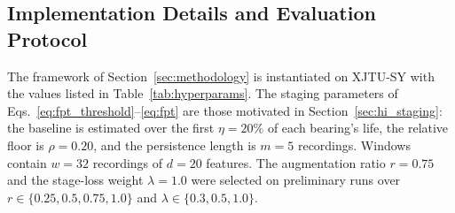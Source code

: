 
\subsection{Implementation Details and Evaluation Protocol}
\label{sec:implementation}

The framework of Section~\ref{sec:methodology} is instantiated on
XJTU-SY with the values listed in Table~\ref{tab:hyperparams}. The
staging parameters of Eqs.~\eqref{eq:fpt_threshold}--\eqref{eq:fpt}
are those motivated in Section~\ref{sec:hi_staging}: the baseline is
estimated over the first $\eta = 20\%$ of each bearing's life, the
relative floor is $\rho = 0.20$, and the persistence length is $m = 5$
recordings. Windows contain $w = 32$ recordings of $d = 20$ features.
The augmentation ratio $r = 0.75$ and the stage-loss weight
$\lambda = 1.0$ were selected on preliminary runs over
$r \in \{0.25, 0.5, 0.75, 1.0\}$ and $\lambda \in \{0.3, 0.5, 1.0\}$.

